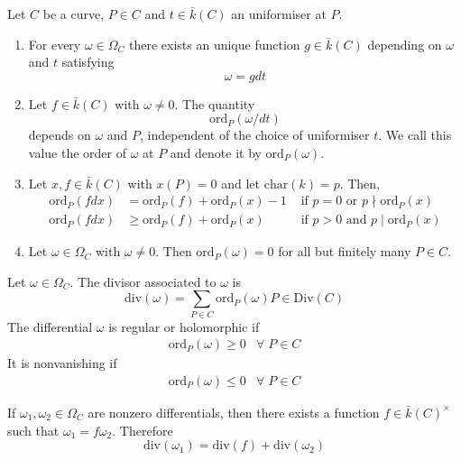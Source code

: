 \documentclass[oneside, 12pt]{scrbook}
\newcommand{\ord}{\mathrm{ord}}
\theoremstyle{theorem}
\begin{document}
\begin{proposition}
Let $C$ be a curve, $P \in C$ and $t \in \bar{k}(C)$ an uniformiser at $P$. 
\begin{enumerate}
\item For every $\omega \in \Omega_{C}$ there exists an unique function $g \in \bar{k}(C)$ depending on $\omega$ and $t$ satisfying $$\omega = g dt$$
\item Let $f \in \bar{k}(C)$ with $\omega \neq 0$. The quantity $$\ord_{P} (\omega / dt)$$ depends on $\omega$ and $P$, independent of the choice of uniformiser $t$. We call this value the order of $\omega$ at $P$ and denote it by $\ord_{P}(\omega)$.
\item Let $x,f \in \bar{k}(C)$ with $x(P)=0$ and let $\mathrm{char}(k)=p$. Then, 
\begin{align*}
\ord_{P}(fdx) &= \ord_{P}(f) + \ord_{P}(x) - 1 &\text{ if } p=0 \text{ or } p \nmid \ord_{P}(x) \\
\ord_{P}(fdx) &\geq \ord_{P}(f) + \ord_{P}(x) &\text{ if } p > 0 \text{ and } p \mid \ord_{P}(x)
\end{align*}
\item Let $\omega \in \Omega_{C}$ with $\omega \neq 0$. Then $\ord_{P}(\omega)=0$ for all but finitely many $P \in C$.
\end{enumerate}
\end{proposition}

\begin{definition}
Let $\omega \in \Omega_{C}$. The divisor associated to $\omega$ is 
\begin{equation*}
\mathrm{div}(\omega) = \sum_{P \in C} \ord_{P}(\omega) P \in \mathrm{Div}(C)
\end{equation*}
The differential $\omega$ is regular or holomorphic if 
\begin{eqnarray}
\ord_{P}(\omega) \geq 0 &\forall \; P \in C
\end{eqnarray}
It is nonvanishing if 
\begin{eqnarray}
\ord_{P}(\omega) \le 0 &\forall \; P \in C
\end{eqnarray}
\end{definition}

\begin{remark}
If $\omega_{1}, \omega_{2} \in \Omega_{C}$ are nonzero differentials, then there exists a function $f \in \bar{k}(C)^{\times}$ such that $\omega_{1} = f\omega_{2}$. Therefore $$\mathrm{div}(\omega_{1}) = \mathrm{div}(f) + \mathrm{div}(\omega_{2})$$
\end{remark}
\end{document}
